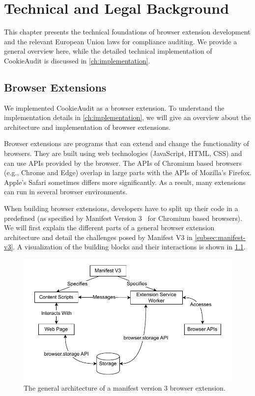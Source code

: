 \chapter{Technical and Legal Background}

This chapter presents the technical foundations of browser extension development and the relevant European Union laws for compliance auditing. We provide a general overview here, while the detailed technical implementation of CookieAudit is discussed in \cref{ch:implementation}.

\section{Browser Extensions}
We implemented CookieAudit as a browser extension.
To understand the implementation details in \cref{ch:implementation}, we will give an overview about the architecture and implementation of browser extensions.

Browser extensions are programs that can extend and change the functionality of browsers.
They are built using web technologies (JavaScript, HTML, CSS) and can use APIs provided by the browser.
The APIs of Chromium based browsers (e.g., Chrome and Edge) overlap in large parts with the APIs of Mozilla's Firefox. Apple's Safari sometimes differs more significantly.
As a result, many extensions can run in several browser environments.

When building browser extensions, developers have to split up their code in a predefined (as specified by Manifest Version 3~\cite{manifestv3} for Chromium based browsers).
We will first explain the different parts of a general browser extension architecture and detail the challenges posed by Manifest V3 in \cref{subsec:manifest-v3}.
A visualization of the building blocks and their interactions is shown in \cref{fig:extension-architecture}.

\begin{figure}
	\centering
	\includegraphics[width=\textwidth]{media/browser-extension-architecture.drawio.pdf}
    \caption{The general architecture of a manifest version 3 browser extension.}
    \label{fig:extension-architecture}
\end{figure}

